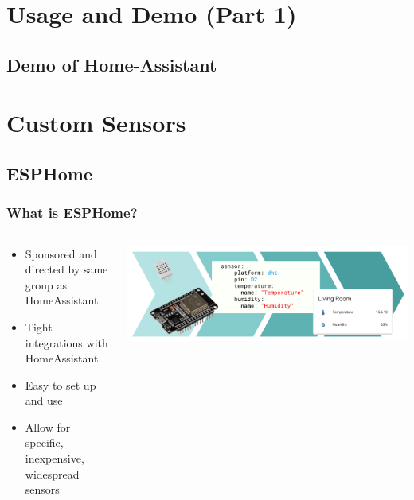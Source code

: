\documentclass[aspectratio=169]{beamer}
\begin{document}
\section{Usage and Demo (Part 1)}
\subsection{Demo of Home-Assistant}
\frame{\subsectionpage}

\section{Custom Sensors}
\frame{\sectionpage}
\subsection{ESPHome}
\frame{\subsectionpage}
\begin{frame}[fragile]
  \frametitle{What is ESPHome?}
  \begin{columns}[]
    \begin{column}[T]{0.45\paperwidth}
      \begin{itemize}%
        \item{Sponsored and directed by same group as HomeAssistant}
        \item{Tight integrations with HomeAssistant}
        \item{Easy to set up and use}
        \item{Allow for specific, inexpensive, widespread sensors}
     \end{itemize}
    \end{column}
    \begin{column}[T]{0.45\paperwidth}
      \includegraphics[width=0.45\paperwidth,keepaspectratio]{images/esp.png}
    \end{column}
  \end{columns}
\end{frame}
\end{document}
